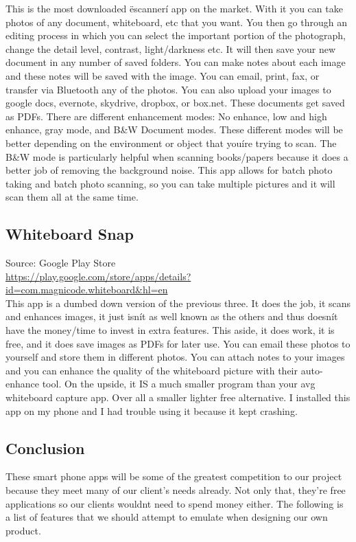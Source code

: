 \documentclass{article}
\begin{document}
This is the most downloaded ëscannerí app on the market. With it you can take photos of any document, whiteboard, etc that you want. You then go through an editing process in which you can select the important portion of the photograph, change the detail level, contrast, light/darkness etc. It will then save your new document in any number of saved folders. You can make notes about each image and these notes will be saved with the image. You can email, print, fax, or transfer via Bluetooth any of the photos. You can also upload your images to google docs, evernote, skydrive, dropbox, or box.net. These documents get saved as PDFs. There are different enhancement modes: No enhance, low and high enhance, gray mode, and B\&W Document modes. These different modes will be better depending on the environment or object that youíre trying to scan. The B\&W mode is particularly helpful when scanning books/papers because it does a better job of removing the background noise. This app allows for batch photo taking and batch photo scanning, so you can take multiple pictures and it will scan them all at the same time. \\
				\subsection*{Whiteboard Snap}
Source: Google Play Store\\
{\color{red} \url{https://play.google.com/store/apps/details?id=com.magnicode.whiteboard&hl=en}} \\
					
This app is a dumbed down version of the previous three. It does the job, it scans and enhances images, it just isnít as well known as the others and thus doesnít have the money/time to invest in extra features. This aside, it does work, it is free, and it does save images as PDFs for later use. You can email these photos to yourself and store them in different photos. You can attach notes to your images and you can enhance the quality of the whiteboard picture with their auto-enhance tool. On the upside, it IS a much smaller program than your avg whiteboard capture app. Over all a smaller lighter free alternative. I installed this app on my phone and I had trouble using it because it kept crashing. \\

     \subsection*{Conclusion}
These smart phone apps will be some of the greatest competition to our project because they meet many of our client's needs already. Not only that, they're free applications so our clients wouldnt need to spend money either. The following is a list of features that we should attempt to emulate when designing our own product.
\end{document}
